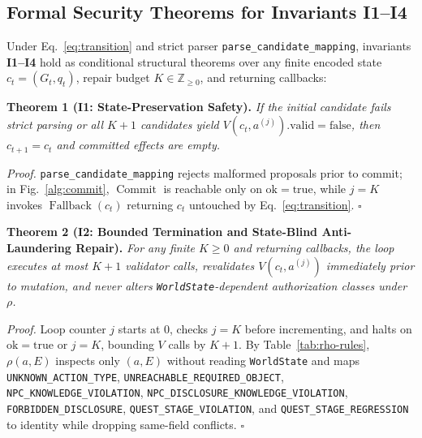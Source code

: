 \subsection{Formal Security Theorems for Invariants I1--I4}\label{sec:formal-proofs}
Under Eq.~\eqref{eq:transition} and strict parser \texttt{parse\_}\allowbreak\texttt{candidate\_}\allowbreak\texttt{mapping}, invariants \textbf{I1--I4} hold as conditional structural theorems over any finite encoded state $c_t=(G_t,q_t)$, repair budget $K\in\mathbb{Z}_{\geq 0}$, and returning callbacks:

\noindent\textbf{Theorem 1 (I1: State-Preservation Safety).} \emph{If the initial candidate fails strict parsing or all $K{+}1$ candidates yield $V(c_t,a^{(j)}).\mathrm{valid}=\mathrm{false}$, then $c_{t+1}=c_t$ and committed effects are empty.}
\par\noindent\textit{Proof.} \texttt{parse\_}\allowbreak\texttt{candidate\_}\allowbreak\texttt{mapping} rejects malformed proposals prior to commit; in Fig.~\ref{alg:commit}, $\operatorname{Commit}$ is reachable only on $\mathrm{ok}=\mathrm{true}$, while $j=K$ invokes $\operatorname{Fallback}(c_t)$ returning $c_t$ untouched by Eq.~\eqref{eq:transition}. \hfill$\square$

\noindent\textbf{Theorem 2 (I2: Bounded Termination and State-Blind Anti-Laundering Repair).} \emph{For any finite $K{\geq}0$ and returning callbacks, the loop executes at most $K{+}1$ validator calls, revalidates $V(c_t,a^{(j)})$ immediately prior to mutation, and never alters \texttt{WorldState}-dependent authorization classes under $\rho$.}
\par\noindent\textit{Proof.} Loop counter $j$ starts at $0$, checks $j=K$ before incrementing, and halts on $\mathrm{ok}=\mathrm{true}$ or $j=K$, bounding $V$ calls by $K{+}1$. By Table~\ref{tab:rho-rules}, $\rho(a,E)$ inspects only $(a,E)$ without reading \texttt{WorldState} and maps \texttt{UNKNOWN\_}\allowbreak\texttt{ACTION\_}\allowbreak\texttt{TYPE}, \texttt{UNREACHABLE\_}\allowbreak\texttt{REQUIRED\_}\allowbreak\texttt{OBJECT}, \texttt{NPC\_}\allowbreak\texttt{KNOWLEDGE\_}\allowbreak\texttt{VIOLATION}, \texttt{NPC\_}\allowbreak\texttt{DIS\-CLOSURE\_}\allowbreak\texttt{KNOW\-LEDGE\_}\allowbreak\texttt{VIO\-LATION}, \texttt{FORBIDDEN\_}\allowbreak\texttt{DISCLOSURE}, \texttt{QUEST\_}\allowbreak\texttt{STAGE\_}\allowbreak\texttt{VIOLATION}, and \texttt{QUEST\_}\allowbreak\texttt{STAGE\_}\allowbreak\texttt{REGRESSION} to identity while dropping same-field conflicts. \hfill$\square$

